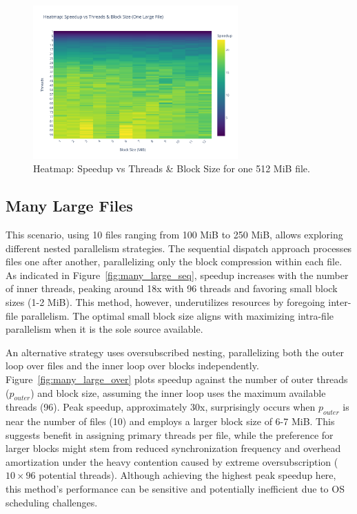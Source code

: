 \documentclass[10pt]{article}
\begin{document}
\begin{figure}[H]
    \centering
    \includegraphics[width=0.7\textwidth]{../results/plots/one_large/speedup_matrix_one_large.pdf}
    \caption{Heatmap: Speedup vs Threads \& Block Size for one 512 MiB file.}
    \label{fig:one_large}
\end{figure}

\subsection*{Many Large Files}
This scenario, using 10 files ranging from 100 MiB to 250 MiB, allows exploring different nested parallelism strategies. The sequential dispatch approach processes files one after another, parallelizing only the block compression within each file. As indicated in Figure~\ref{fig:many_large_seq}, speedup increases with the number of inner threads, peaking around 18x with 96 threads and favoring small block sizes (1-2 MiB). This method, however, underutilizes resources by foregoing inter-file parallelism. The optimal small block size aligns with maximizing intra-file parallelism when it is the sole source available.

An alternative strategy uses oversubscribed nesting, parallelizing both the outer loop over files and the inner loop over blocks independently. Figure~\ref{fig:many_large_over} plots speedup against the number of outer threads ($p_{outer}$) and block size, assuming the inner loop uses the maximum available threads (96). Peak speedup, approximately 30x, surprisingly occurs when $p_{outer}$ is near the number of files (10) and employs a larger block size of 6-7 MiB. This suggests benefit in assigning primary threads per file, while the preference for larger blocks might stem from reduced synchronization frequency and overhead amortization under the heavy contention caused by extreme oversubscription ($10 \times 96$ potential threads). Although achieving the highest peak speedup here, this method's performance can be sensitive and potentially inefficient due to OS scheduling challenges.
\end{document}

